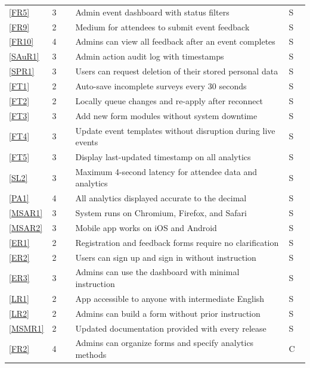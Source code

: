 \documentclass[12pt]{article}
\begin{document}
{\begin{longtable}[H]{p{0.1\linewidth}p{0.08\linewidth}p{0.75\linewidth}p{0.07\linewidth}}
  \ref{FR5}   & 3 & Admin event dashboard with status filters                     & S \\
  \ref{FR9}   & 2 & Medium for attendees to submit event feedback                 & S \\
  \ref{FR10}  & 4 & Admins can view all feedback after an event completes         & S \\
  \ref{SAuR1} & 3 & Admin action audit log with timestamps                        & S \\
  \ref{SPR1}  & 3 & Users can request deletion of their stored personal data      & S \\
  \ref{FT1}   & 2 & Auto-save incomplete surveys every 30 seconds                 & S \\
  \ref{FT2}   & 2 & Locally queue changes and re-apply after reconnect            & S \\
  \ref{FT3}   & 3 & Add new form modules without system downtime                  & S \\
  \ref{FT4}   & 3 & Update event templates without disruption during live events  & S \\
  \ref{FT5}   & 3 & Display last-updated timestamp on all analytics               & S \\
  \ref{SL2}   & 3 & Maximum 4-second latency for attendee data and analytics      & S \\
  \ref{PA1}   & 4 & All analytics displayed accurate to the decimal               & S \\
  \ref{MSAR1} & 3 & System runs on Chromium, Firefox, and Safari                  & S \\
  \ref{MSAR2} & 3 & Mobile app works on iOS and Android                           & S \\
  \ref{ER1}   & 2 & Registration and feedback forms require no clarification       & S \\
  \ref{ER2}   & 2 & Users can sign up and sign in without instruction              & S \\
  \ref{ER3}   & 3 & Admins can use the dashboard with minimal instruction         & S \\
  \ref{LR1}   & 2 & App accessible to anyone with intermediate English            & S \\
  \ref{LR2}   & 2 & Admins can build a form without prior instruction             & S \\
  \ref{MSMR1} & 2 & Updated documentation provided with every release             & S \\
  \ref{FR2}   & 4 & Admins can organize forms and specify analytics methods       & C \\

\end{longtable}}
\end{document}
